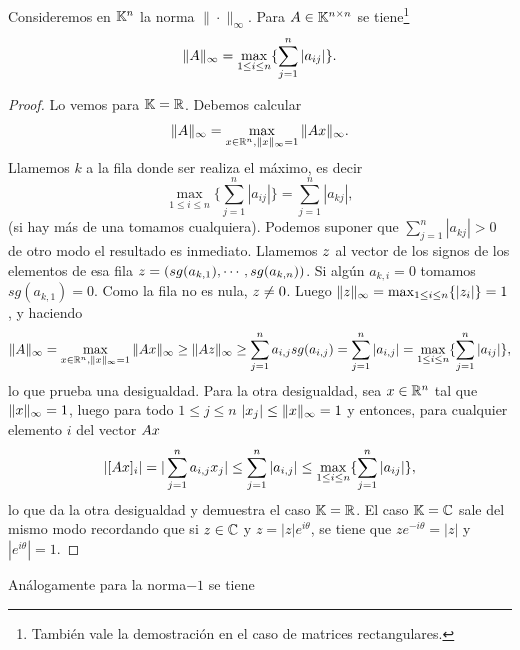 \begin{ejemplo}
Consideremos en $\mathbb K^n$ la norma $\|\cdot\|_\infty$. Para $\Ab\in \Knn$ se tiene\footnote{También vale la demostración en el caso de matrices rectangulares.}
\tcc
$$
 \|\Ab\|_\infty=\max_{1\le i\le n}\{\sum_{j=1}^{n} |a_{ij}|\}.
$$
\etcc
\begin{proof}
 Lo vemos para $\mathbb K=\mathbb R$. Debemos calcular
$$\|\Ab\|_\infty =
\max_{\xb \in \R^n, \|\xb\|_\infty = 1} \|\Ab\xb\|_\infty.
 $$
 Llamemos $k$ a la fila donde ser realiza el máximo, es decir
 $$
 \max_{1\le i\le n}\{\sum_{j=1}^{n} |a_{ij}|\}=\sum_{j=1}^{n} |a_{kj}|,
 $$
 (si hay más de una tomamos cualquiera). Podemos suponer que
 $\sum_{j=1}^{n} |a_{kj}|>0$ de otro modo el resultado es inmediato. Llamemos $\zb$ al vector de los signos de los elementos de esa fila $\zb=(sg(a_{k,1}),\cdots ,sg(a_{k,n}))$. Si algún $a_{k,i}=0$ tomamos $sg(a_{k,1})=0$. Como la fila no es nula, $\zb\neq\cero$. Luego $\|\zb\|_\infty=\max_{1\le i\le n}\{|z_i|\}=1$, y  haciendo
 $$
\|\Ab\|_\infty =\max_{\xb \in \R^n, \|\xb\|_\infty = 1} \|\Ab\xb\|_\infty
 \ge \|\Ab\zb\|_\infty\ge \sum_{j=1}^n a_{i,j}sg(a_{i,j})=\sum_{j=1}^n |a_{i,j}|=\max_{1\le i\le n}\{\sum_{j=1}^{n} |a_{ij}|\},
 $$
 lo que prueba una desigualdad. Para la otra desigualdad, sea $\xb\in \R^n$ tal que $\|\xb\|_\infty=1$, luego para todo $1\le j\le n$ $|x_j|\le \|\xb\|_\infty=1$ y entonces, para cualquier elemento $i$ del vector $\Ab\xb$
$$
|[\Ab\xb]_i|=|\sum_{j=1}^na_{i,j}x_j |\le \sum_{j=1}^n|a_{i,j}|\le \max_{1\le i\le n}\{\sum_{j=1}^{n} |a_{ij}|\},
$$
lo que da la otra desigualdad y demuestra el caso $\mathbb K=\mathbb R$.
El caso $\mathbb K=\mathbb C$ sale del mismo modo recordando que si $z\in \mathbb C$ y $z=|z|e^{i\theta}$, se tiene que $ze^{-i\theta}=|z|$ y $|e^{i\theta}|=1$.
\end{proof}
Análogamente para la norma$-1$ se tiene
\end{ejemplo}

